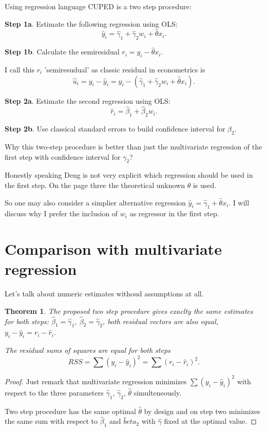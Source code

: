 \documentclass[10pt, a4paper]{article}
\newtheorem{theorem}{Theorem}
\begin{document}
Using regression language CUPED is a two step procedure:

\textbf{Step 1a}. Estimate the following regression using OLS: 
\[
    \hat y_i = \hat \gamma_1 + \hat\gamma_2 w_i + \hat \theta x_i.
\]

\textbf{Step 1b}. Calculate the semiresidual $r_i = y_i - \hat \theta x_i$.

I call this $r_i$ 'semiresudual' as classic residual in econometrics is 
\[
\hat u_i = y_i - \hat y_i = y_i - (\hat\gamma_1 + \hat\gamma_2 w_i + \hat\theta x_i).
\]


\textbf{Step 2a}. Estimate the second regression using OLS:
\[
    \hat r_i = \hat \beta_1 + \hat \beta_2 w_i.
\]

\textbf{Step 2b}. Use classical standard errors to build confidence interval for $\beta_2$.


Why this two-step procedure is better than just the multivariate regression
of the first step with confidence interval for $\gamma_2$?


Honestly speaking Deng is not very explicit which regression should be used in the first step.  
On the page three the theoretical unknown $\theta$ is used. 

So one may also consider a simplier alternative regression $\hat y_i = \hat \gamma_1 + \hat \theta x_i$.
I will discuss why I prefer the inclusion of $w_i$ as regressor in the first step.


\section{Comparison with multivariate regression}

Let's talk about numeric estimates withoud assumptions at all. 

\begin{theorem}
    The proposed two step procedure gives exaclty the same estimates for both steps: $\hat\beta_1 = \hat\gamma_1$,
    $\hat\beta_2 = \hat\gamma_2$, both residual vectors are also equal, $y_i - \hat y_i = r_i - \hat r_i$.

    The residual sums of squares are equal for both steps
    \[
     RSS = \sum (y_i - \hat y_i)^2 = \sum (r_i - \hat r_i)^2.
    \]
\end{theorem}

\begin{proof}
Just remark that multivariate regression minimizes $\sum (y_i - \hat y_i)^2$ with 
respect to the three parameters $\hat\gamma_1$, $\hat\gamma_2$, $\hat\theta$ simulteneously.

Two step procedure has the same optimal $\hat \theta$ by design and on step two minimizes 
the same sum with respect to $\hat\beta_1$ and $\hat beta_2$ 
with $\hat\gamma$ fixed at the optimal value.
\end{proof}
\end{document}
